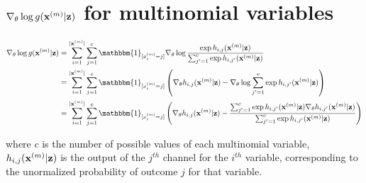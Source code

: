 \documentclass{article}
\begin{document}
\section{$\nabla_\theta\log{g({\mathbf x}^{(m)}|{\mathbf z})}$ for multinomial variables}



\begin{align*}
\nabla_\theta\log{g(\x^{(m)}|\z)} & = \sum_{i=1}^{|\x^{(m)}|} \sum_{j=1}^c \mathbbm{1}_{[x_i^{(m)} = j]} \nabla_\theta \log{ \frac{\exp{h_{i,j}(\x^{(m)}|\z)}}{\sum_{j' = 1}^c \exp{h_{i,j'}(\x^{(m)}|\z)}}} \\
  & = \sum_{i=1}^{|\x^{(m)}|} \sum_{j=1}^c \mathbbm{1}_{[x_i^{(m)} = j]} \left( \nabla_\theta h_{i,j}(\x^{(m)}|\z) -  \nabla_\theta \log{\sum_{j' = 1}^c \exp{h_{i,j'}(\x^{(m)}|\z)}}\right) \\
  & =  \sum_{i=1}^{|\x^{(m)}|} \sum_{j=1}^c \mathbbm{1}_{[x_i^{(m)} = j]} \left( \nabla_\theta h_{i,j}(\x^{(m)}|\z) - \frac{\sum_{j' = 1}^c \exp{h_{i,j'}(\x^{(m)}|\z)}\nabla_\theta h_{i,j'}(\x^{(m)}|\z)}{\sum_{j' = 1}^c \exp{h_{i,j'}(\x^{(m)}|\z)}} \right)
\end{align*}

\noindent where $c$ is the number of possible values of each
multinomial variable, $h_{i,j}({\mathbf x}^{(m)}|{\mathbf z})$ is the output of the
$j^{th}$ channel for the $i^{th}$ variable, corresponding to the
unormalized probability of outcome $j$ for that variable.
\end{document}
